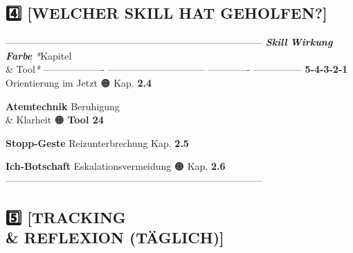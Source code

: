 {\subsection{4️⃣ \textbf{[WELCHER SKILL HAT GEHOLFEN?]}}

--------------------------------------------------------------------------------
\textbf{\textit{Skill}}         \textbf{\textit{Wirkung}}                  \textbf{\textit{Farbe}}   \textit{*}Kapitel \\&
Tool\textit{*}
------------------- ------------------------------ ------------- ---------------
\textbf{5-4-3-2-1}       Orientierung im Jetzt          🟠            Kap. \textbf{2.4}

\textbf{Atemtechnik}     Beruhigung \\& Klarheit          🟠            \textbf{Tool 24}

\textbf{Stopp-Geste}     Reizunterbrechung              \textcolor{ctmmRed}{\faCircle}            Kap. \textbf{2.5}

\textbf{Ich-Botschaft}   Eskalationsvermeidung          🟠            Kap. \textbf{2.6}
--------------------------------------------------------------------------------

\subsection{5️⃣ \textbf{[TRACKING \\& REFLEXION (TÄGLICH)]}}

}
